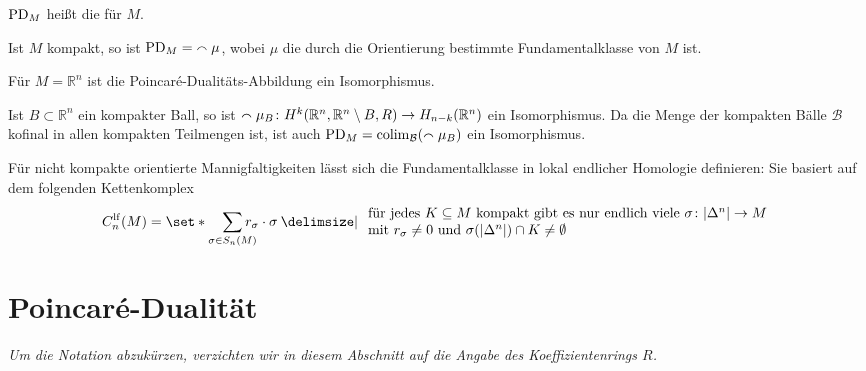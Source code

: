 \begin{definition}[{name=[{Poincaré-Dualitäts-Abbildung}]}]
	$\operatorname{PD}_M$ heißt die  für $M$. 
\end{definition}

\begin{bemerkung}[{name=[{Dualitäts-Abbildung für kompakte Mannigfaltigkeiten}]}]
	Ist $M$ kompakt, so ist $\operatorname{PD}_M= {\smallfrown \mu}$, wobei $\mu$ die durch die Orientierung bestimmte Fundamentalklasse von $M$ ist.
\end{bemerkung}

\begin{lemma}[{name=[{Dualitäts-Abbildung ist ein Isomorphismus für den euklidischen Raum}]},label=lem:poincare_eukli_raum]
	Für $M=\mathbb{R}^n$ ist die Poincaré-Dualitäts-Abbildung ein Isomorphismus. 
\end{lemma}
\begin{beweis}
	Ist $B \subset \mathbb{R}^n$ ein kompakter Ball, so ist ${\smallfrown\mu_B} \colon H^k(\mathbb{R}^n,\mathbb{R}^n \setminus B,R) \to H_{n-k}(\mathbb{R}^n)$ ein Isomorphismus.
	Da die Menge der kompakten Bälle $\mathcal{B}$ kofinal in allen kompakten Teilmengen ist, ist auch
	\(
		\PD_M = \colim_{\mathcal{B}} \enbrace*{\capp \mu_B}
	\)
	ein Isomorphismus.
\end{beweis}

\begin{bemerkung}[{name=[{lokal endliche Homologie}]}]
	Für nicht kompakte orientierte Mannigfaltigkeiten lässt sich die Fundamentalklasse in lokal endlicher Homologie definieren: 
	Sie basiert auf dem folgenden Kettenkomplex
	\[
		C^\lf_{n}(M) = \set*{\sum_{\sigma\in S_n(M)}\hspace{-1em} r_\sigma \cdot \sigma \given \begin{array}{l}
			\text{für jedes $K \subseteq M$ kompakt gibt es nur endlich viele $\sigma \colon \abs*{\Delta^n} \to M$} \\
			\text{mit $r_\sigma\neq 0$ und $\sigma(\abs*{\Delta^n}) \cap K \neq \emptyset$} 
		\end{array}
		  }
	\]
\end{bemerkung}
\newpage

\section{Poincaré-Dualität} %
\label{sec:8}

\emph{Um die Notation abzukürzen, verzichten wir in diesem Abschnitt auf die Angabe des Koeffizientenrings $R$.}

